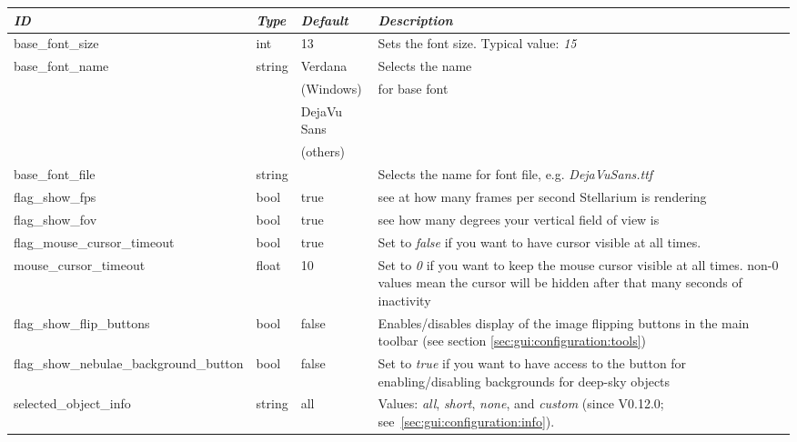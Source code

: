 \begin{longtabu} to \textwidth {l|l|l|X}
\toprule
\emph{ID} & \emph{Type} & \emph{Default} & \emph{Description}\\\midrule
base\_font\_size & int    & 13 & Sets the font size. Typical value: \emph{15}\\\midrule
base\_font\_name & string & Verdana     & Selects the name \\
                 &        & (Windows)            & for base font\\
                 &        & DejaVu Sans & \\
                 &        & (others)            & \\\midrule
base\_font\_file & string & & Selects the name for font file, e.g. \emph{DejaVuSans.ttf}\\\midrule
flag\_show\_fps                 & bool   & true & see at how many frames per second Stellarium is rendering\\\midrule
flag\_show\_fov                 & bool   & true & see how many degrees your vertical field of view is\\\midrule
flag\_mouse\_cursor\_timeout    & bool  & true  & Set to \emph{false} if you want to have cursor visible at all times.\\\midrule
mouse\_cursor\_timeout          & float & 10    & Set to \emph{0} if you want to keep the mouse cursor visible at all times. 
                                                  non-0 values mean the cursor will be hidden after that many seconds of inactivity\\\midrule
flag\_show\_flip\_buttons       & bool  & false & Enables/disables display of the image flipping buttons in the main 
                                                  toolbar (see section \ref{sec:gui:configuration:tools})\\\midrule
flag\_show\_nebulae\_background\_button & bool & false & Set to \emph{true} if you want to have access to the 
                                                         button for enabling/disabling backgrounds for deep-sky objects\\\midrule
selected\_object\_info          & string & all  & Values: \emph{all}, \emph{short}, \emph{none}, 
                                                  and \emph{custom} (since V0.12.0; see~\ref{sec:gui:configuration:info}).\\\midrule

\end{longtabu}
